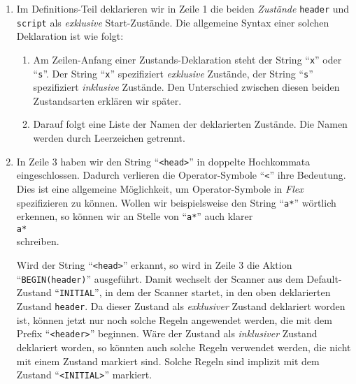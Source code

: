 \begin{enumerate}
\item Im Definitions-Teil deklarieren wir in Zeile 1 die beiden \textsl{Zust\"ande}\/
      \texttt{header} und \texttt{script} als \emph{exklusive} Start-Zust\"ande.
      Die allgemeine Syntax einer solchen Deklaration ist wie folgt:
      \begin{enumerate}
      \item Am Zeilen-Anfang einer Zustands-Deklaration steht der String ``\texttt{x}''
            oder ``\texttt{s}''.  
            Der String ``\texttt{x}'' spezifiziert \emph{exklusive} Zust\"ande,
            der String ``\texttt{s}'' spezifiziert \emph{inklusive} Zust\"ande.
            Den Unterschied zwischen diesen beiden Zustandsarten erkl\"aren wir sp\"ater.
      \item Darauf folgt eine Liste der Namen der deklarierten Zust\"ande.  Die Namen werden
            durch Leerzeichen getrennt.
      \end{enumerate}
\item In Zeile 3 haben wir den String ``\texttt{<head>}'' in doppelte Hochkommata
      eingeschlossen.  Dadurch verlieren die Operator-Symbole ``\texttt{<}'' ihre
      Bedeutung.  Dies ist eine allgemeine M\"oglichkeit, um Operator-Symbole in
      \textsl{Flex}\/ spezifizieren zu k\"onnen.  Wollen wir beispielsweise den String
      ``\texttt{a*}''  w\"ortlich erkennen, so k\"onnen wir an Stelle von ``\texttt{a*}''
      auch klarer
      \\[0.2cm]
      \hspace*{1.3cm}
      \texttt{a*}
      \\[0.2cm]
      schreiben.
      
      Wird der String ``\texttt{<head>}'' erkannt, so wird in Zeile 3 die Aktion 
      ``\texttt{BEGIN(header)}'' ausgef\"uhrt.  Damit wechselt der Scanner aus dem
      Default-Zustand ``\texttt{INITIAL}'', in dem der Scanner startet,
      in den oben deklarierten Zustand \texttt{header}.
      Da dieser Zustand als \emph{exklusiver} Zustand deklariert worden ist, k\"onnen jetzt
      nur noch solche Regeln angewendet werden, die mit dem Prefix ``\texttt{<header>}''
      beginnen.  W\"are der Zustand als \emph{inklusiver} Zustand deklariert worden, so k\"onnten auch solche 
      Regeln verwendet werden, die nicht mit einem Zustand markiert sind.  Solche Regeln
      sind implizit mit dem Zustand ``\texttt{<INITIAL>}'' markiert.
      

\end{enumerate}
